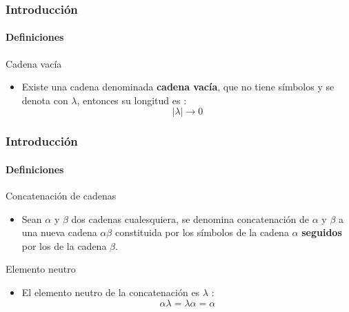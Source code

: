 \documentclass{beamer}
\begin{document}
        \begin{frame}
            \frametitle{Introducci\'on}
            \framesubtitle{Definiciones}

            \begin{block}{Cadena vac\'ia}
                \begin{itemize}
                    \item[\checkmark] Existe una cadena denominada \textbf{cadena vac\'ia}, que no tiene s\'imbolos y se denota con $\lambda$, entonces su longitud es :
                    $$|\lambda| \rightarrow 0$$
                \end{itemize}
			\end{block}
		\end{frame}     

        \begin{frame}
            \frametitle{Introducci\'on}
            \framesubtitle{Definiciones}

            \begin{block}{Concatenaci\'on de cadenas}
                \begin{itemize}
                    \item[\checkmark] Sean $\alpha$ y $\beta$ dos cadenas cualesquiera, se denomina concatenaci\'on de $\alpha$ y $\beta$ a una nueva cadena $\alpha\beta$ constituida por los s\'imbolos de la cadena $\alpha$ \textbf{seguidos} por los de la cadena $\beta$.
                \end{itemize}
			\end{block}
			\begin{block}{Elemento neutro}
                \begin{itemize}
                    \item[\checkmark] El elemento neutro de la concatenaci\'on es $\lambda$ :
                    $$\alpha\lambda = \lambda\alpha = \alpha$$
                \end{itemize}
			\end{block}
		\end{frame}
\end{document}
